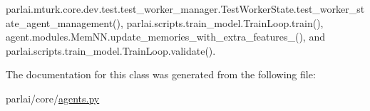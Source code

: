 parlai.\+mturk.\+core.\+dev.\+test.\+test\+\_\+worker\+\_\+manager.\+Test\+Worker\+State.\+test\+\_\+worker\+\_\+state\+\_\+agent\+\_\+management(), parlai.\+scripts.\+train\+\_\+model.\+Train\+Loop.\+train(), agent.\+modules.\+Mem\+N\+N.\+update\+\_\+memories\+\_\+with\+\_\+extra\+\_\+features\+\_\+(), and parlai.\+scripts.\+train\+\_\+model.\+Train\+Loop.\+validate().



The documentation for this class was generated from the following file\+:\begin{DoxyCompactItemize}
\item 
parlai/core/\hyperlink{parlai_2core_2agents_8py}{agents.\+py}\end{DoxyCompactItemize}
